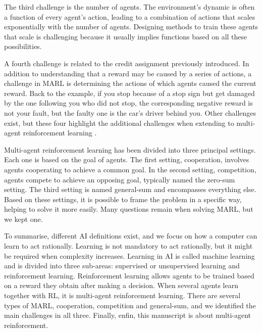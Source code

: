 The third challenge is the number of agents.
The environment's dynamic is often a function of every agent's action, leading to a combination of actions that scales exponentially with the number of agents.
Designing methods to train these agents that scale is challenging because it usually implies functions based on all these possibilities.

A fourth challenge is related to the credit assignment previously introduced.
In addition to understanding that a reward may be caused by a series of actions, a challenge in MARL is determining the actions of which agents caused the current reward.
Back to the example, if you stop because of a stop sign but get damaged by the one following you who did not stop, the corresponding negative reward is not your fault, but the faulty one is the car's driver behind you.
Other challenges exist, but these four highlight the additional challenges when extending to multi-agent reinforcement learning \cite{marl-book}.

Multi-agent reinforcement learning has been divided into three principal settings.
Each one is based on the goal of agents.
The first setting, cooperation, involves agents cooperating to achieve a common goal.
In the second setting, competition, agents compete to achieve an opposing goal, typically named the zero-sum setting.
The third setting is named general-sum and encompasses everything else.
Based on these settings, it is possible to frame the problem in a specific way, helping to solve it more easily.
Many questions remain when solving MARL, but we kept one.

To summarise, different AI definitions exist, and we focus on how a computer can learn to act rationally.
Learning is not mandatory to act rationally, but it might be required when complexity increases.
Learning in AI is called machine learning and is divided into three sub-areas: supervised or unsupervised learning and reinforcement learning.
Reinforcement learning allows agents to be trained based on a reward they obtain after making a decision.
When several agents learn together with RL, it is multi-agent reinforcement learning.
There are several types of MARL, cooperation, competition and general-sum, and we identified the main challenges in all three.
Finally, enfin, this manuscript is about multi-agent reinforcement. 


